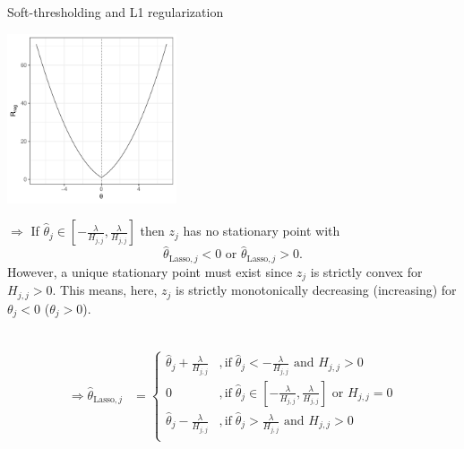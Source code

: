 \documentclass[11pt,compress,t,notes=noshow, xcolor=table]{beamer}
\begin{document}
\begin{vbframe}{Soft-thresholding and L1 regularization}
\begin{minipage}{0.4\textwidth}
    \includegraphics[width=5cm]{figure/th_l1_zero.pdf}
\end{minipage}
\hfill
\begin{minipage}{0.49\textwidth}
$\Rightarrow$ If $\hat{\theta}_j \in [-\frac{\lambda}{H_{j,j}}, \frac{\lambda}{H_{j,j}}]$ then $z_j$ has no stationary point with $$\hat{\theta}_{\text{Lasso},j} < 0 \text{ or } \hat{\theta}_{\text{Lasso},j} > 0.$$ 
However, a unique stationary point must exist since $z_j$ is strictly convex for $H_{j,j} > 0$. This means, here, $z_j$ is strictly monotonically decreasing (increasing) for $\theta_j < 0 $ ($\theta_j > 0 $). \\
\end{minipage}
 \\

\begin{align*}\Rightarrow \hat{\theta}_{\text{Lasso},j} &= \begin{cases} 
     \hat{\theta}_j + \frac{\lambda}{H_{j,j}} &, \text{if}   \;\hat{\theta}_j < -\frac{\lambda}{H_{j,j}} \text{ and } H_{j,j} > 0\\
       0 &, \text{if}   \;\hat{\theta}_j \in [-\frac{\lambda}{H_{j,j}}, \frac{\lambda}{H_{j,j}}] \text{ or } H_{j,j} = 0\\
     \hat{\theta}_j - \frac{\lambda}{H_{j,j}} &, \text{if}   \;\hat{\theta}_j > \frac{\lambda}{H_{j,j}} \text{ and } H_{j,j} > 0 \\
     \end{cases}
     \end{align*}

\end{vbframe}

\endlecture
\end{document}
